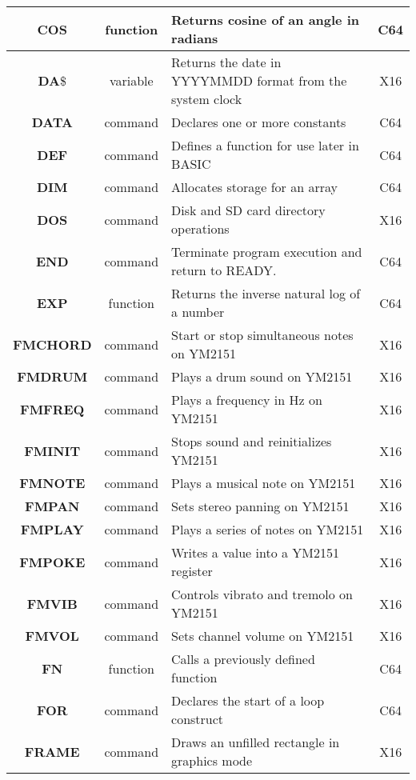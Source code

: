 \begin{longtable}{|c|c|m{4cm}|c|}
	{\bfseries COS} & function & Returns cosine of an angle in radians & C64 \\ \hline
	{\bfseries DA}\$ & variable & Returns the date in YYYYMMDD format from the system clock & X16 \\ \hline
	{\bfseries DATA} & command & Declares one or more constants & C64 \\ \hline
	{\bfseries DEF} & command & Defines a function for use later in BASIC & C64 \\ \hline
	{\bfseries DIM} & command & Allocates storage for an array & C64 \\ \hline
	{\bfseries DOS} & command & Disk and SD card directory operations & X16 \\ \hline
	{\bfseries END} & command & Terminate program execution and return to {\ttfamily READY.} & C64 \\ \hline
	{\bfseries EXP} & function & Returns the inverse natural log of a number & C64 \\ \hline
	{\bfseries FMCHORD} & command & Start or stop simultaneous notes on YM2151 & X16 \\ \hline
	{\bfseries FMDRUM} & command & Plays a drum sound on YM2151 & X16 \\ \hline
	{\bfseries FMFREQ} & command & Plays a frequency in Hz on YM2151 & X16 \\ \hline
	{\bfseries FMINIT} & command & Stops sound and reinitializes YM2151 & X16 \\ \hline
	{\bfseries FMNOTE} & command & Plays a musical note on YM2151 & X16 \\ \hline
	{\bfseries FMPAN} & command & Sets stereo panning on YM2151 & X16 \\ \hline
	{\bfseries FMPLAY} & command & Plays a series of notes on YM2151 & X16 \\ \hline
	{\bfseries FMPOKE} & command & Writes a value into a YM2151 register & X16 \\ \hline
	{\bfseries FMVIB} & command & Controls vibrato and tremolo on YM2151 & X16 \\ \hline
	{\bfseries FMVOL} & command & Sets channel volume on YM2151 & X16 \\ \hline
	{\bfseries FN} & function & Calls a previously defined function & C64 \\ \hline
	{\bfseries FOR} & command & Declares the start of a loop construct & C64 \\ \hline
	{\bfseries FRAME} & command & Draws an unfilled rectangle in graphics mode & X16 \\ \hline

\end{longtable}
